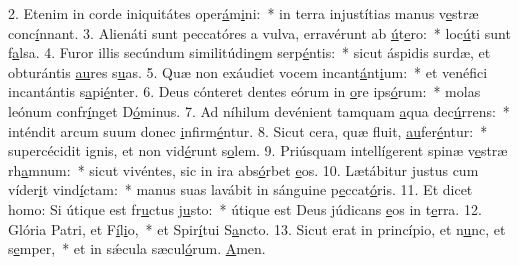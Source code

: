 2. Etenim in corde iniquitátes oper\uline{á}m\uline{i}ni:~* in terra injustítias manus v\uline{e}stræ conc\uline{í}nnant.
3. Alienáti sunt peccatóres a vulva, erravérunt ab \uline{ú}t\uline{e}ro:~* loc\uline{ú}ti sunt f\uline{a}lsa.
4. Furor illis secúndum similitúdin\uline{e}m serp\uline{é}ntis:~* sicut áspidis surdæ, et obturántis \uline{au}res s\uline{u}as.
5. Quæ non exáudiet vocem incant\uline{á}nt\uline{i}um:~* et venéfici incantántis s\uline{a}pi\uline{é}nter.
6. Deus cónteret dentes eórum in \uline{o}re ips\uline{ó}rum:~* molas leónum confr\uline{í}nget D\uline{ó}minus.
7. Ad níhilum devénient tamquam \uline{a}qua dec\uline{ú}rrens:~* inténdit arcum suum donec \uline{i}nfirm\uline{é}ntur.
8. Sicut cera, quæ fluit, \uline{au}fer\uline{é}ntur:~* supercécidit ignis, et non vid\uline{é}runt s\uline{o}lem.
9. Priúsquam intellígerent spinæ v\uline{e}stræ rh\uline{a}mnum:~* sicut vivéntes, sic in ira abs\uline{ó}rbet \uline{e}os.
10. Lætábitur justus cum víder\uline{i}t vind\uline{í}ctam:~* manus suas lavábit in sánguine p\uline{e}ccat\uline{ó}ris.
11. Et dicet homo: Si útique est fr\uline{u}ctus j\uline{u}sto:~* útique est Deus júdicans \uline{e}os in t\uline{e}rra.
12. Glória Patri, et F\uline{í}l\uline{i}o,~* et Spir\uline{í}tui S\uline{a}ncto.
13. Sicut erat in princípio, et n\uline{u}nc, et s\uline{e}mper,~* et in sǽcula sæcul\uline{ó}rum. \uline{A}men.
